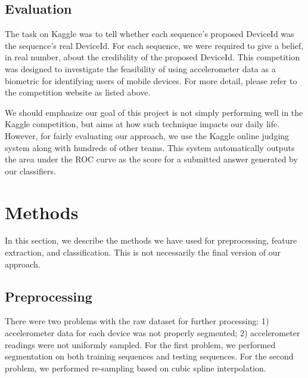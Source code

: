 \documentclass{article} %
\begin{document}
\subsection{Evaluation}
The task on Kaggle was to tell whether each sequence's proposed DeviceId was the sequence's real DeviceId. For each sequence, we were required to give a belief, in real number, about the credibility of the proposed DeviceId. This competition was designed to investigate the feasibility of using accelerometer data as a biometric for identifying users of mobile devices. For more detail, please refer to the competition website as listed above.

We should emphasize our goal of this project is not simply performing well in the Kaggle competition, but aims at how such technique impacts our daily life. However, for fairly evaluating our approach, we use the Kaggle online judging system along with hundreds of other teams. This system automatically outputs the area under the ROC curve as the score for a submitted answer generated by our classifiers. 


\section{Methods}
In this section, we describe the methods we have used for preprocessing, feature extraction, and classification. This is not necessarily the final version of our approach. 


\subsection{Preprocessing}
There were two problems with the raw dataset for further processing: 1) accelerometer data for each device was not properly segmented; 2) accelerometer readings were not uniformly sampled. For the first problem, we performed segmentation on both training sequences and testing sequences. For the second problem, we performed re-sampling based on cubic spline interpolation.
\end{document}

